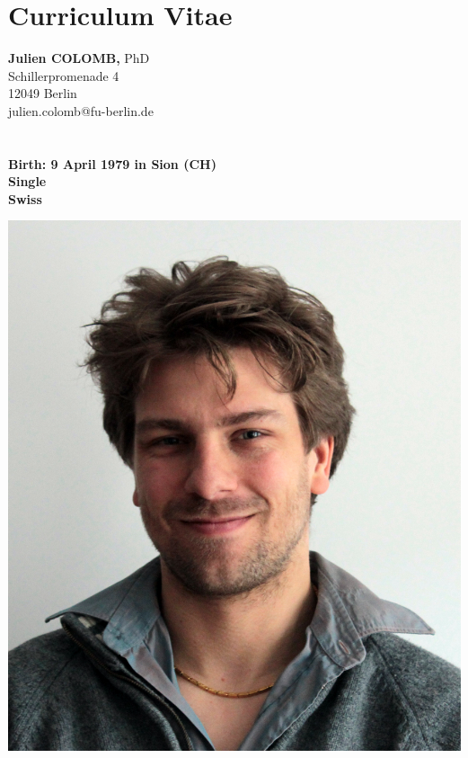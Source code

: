 
\section* {Curriculum Vitae}



\newcommand{\rubrique}[1]{{\textit{\textbf{\large#1}}}\smallskip\\}
\parindent=0in
\addtolength{\parskip}{1.4em}


\small

\begin{minipage}[t]{\textwidth}
    \begin{minipage}[b]{0.5\textwidth}
        \textbf{\Large Julien COLOMB}{\large \textbf, PhD}\\
        Schillerpromenade 4\\
        12049 Berlin\\
        julien.colomb@fu-berlin.de\\
        \\
        \\
        \textbf{Birth: 9 April 1979 in Sion (CH)}\\
        \textbf{Single}\\
        \textbf{Swiss}
    \end{minipage}\hfill
    \begin{minipage}[b]{0.5\textwidth}
        \begin{flushright}
            \includegraphics[scale=1.3] {figures/photo_CV.jpg}

\end{flushright}
\end{minipage}
\end{minipage}
